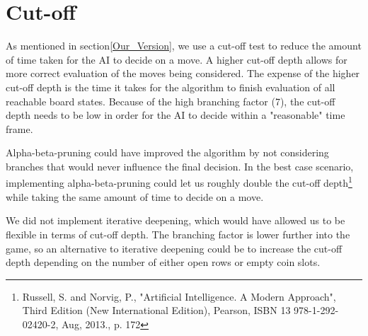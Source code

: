 \section{Cut-off}
\label{Cutoff}
As mentioned in section\ref{Our_Version}, we use a cut-off test to reduce the amount of time taken for the AI to decide on a move. A higher cut-off depth allows for more correct evaluation of the moves being considered. The expense of the higher cut-off depth is the time it takes for the algorithm to finish evaluation of all reachable board states. Because of the high branching factor (7), the cut-off depth needs to be low in order for the AI to decide within a "reasonable" time frame.

Alpha-beta-pruning could have improved the algorithm by not considering branches that would never influence the final decision. In the best case scenario, implementing alpha-beta-pruning could let us roughly double the cut-off depth\footnote{Russell, S. and Norvig, P., "Artificial Intelligence. A Modern Approach", Third Edition (New International Edition), Pearson, ISBN 13 978-1-292-02420-2, Aug, 2013., p. 172} while taking the same amount of time to decide on a move.

We did not implement iterative deepening, which would have allowed us to be flexible in terms of cut-off depth. The branching factor is lower further into the game, so an alternative to iterative deepening could be to increase the cut-off depth depending on the number of either open rows or empty coin slots.